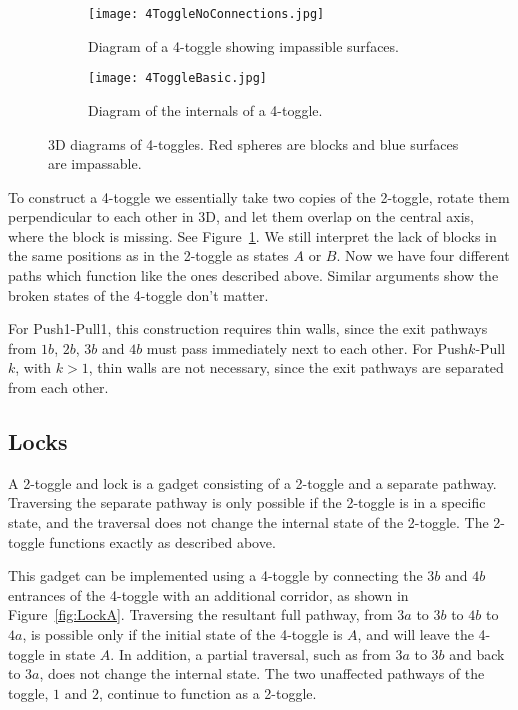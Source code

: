 \begin{figure}[!ht]
  \centering
  \begin{subfigure}[t]{.45\textwidth}
    \texttt{[image: 4ToggleNoConnections.jpg]}
    \caption{Diagram of a 4-toggle showing impassible surfaces.}
    \label{fig:4Toggle3D}
  \end{subfigure}
  \hfill
  \begin{subfigure}[t]{.45\textwidth}
    \texttt{[image: 4ToggleBasic.jpg]}
    \caption{Diagram of the internals of a 4-toggle.}
    \label{fig:4Toggle3DBasic}
  \end{subfigure}
  \caption{3D diagrams of 4-toggles. Red spheres are blocks and blue surfaces are impassable.}
\end{figure}

To construct a 4-toggle we essentially take two copies of the 2-toggle, rotate them perpendicular to each other in 3D, and let them overlap on the central axis, where the block is missing. See Figure~\ref{fig:4Toggle3D}. We still interpret the lack of blocks in the same positions as in the 2-toggle as states $A$ or $B$. Now we have four different paths which function like the ones described above. Similar arguments show the broken states of the 4-toggle don't matter.

For Push1-Pull1, this construction requires thin walls, since the exit pathways from $1b$, $2b$, $3b$ and $4b$ must pass immediately next to each other. For Push$k$-Pull$k$, with $k > 1$, thin walls are not necessary, since the exit pathways are separated from each other.
\subsection{Locks}

A 2-toggle and lock is a gadget consisting of a 2-toggle and a separate pathway. Traversing the separate pathway is only possible if the 2-toggle is in a specific state, and the traversal does not change the internal state of the 2-toggle. The 2-toggle functions exactly
as described above.


This gadget can be implemented using a 4-toggle by
connecting the $3b$ and $4b$ entrances of the 4-toggle with an additional corridor, as shown in Figure~\ref{fig:LockA}.
Traversing the resultant full pathway, from $3a$ to $3b$ to $4b$ to $4a$, is possible only if the initial
state of the 4-toggle is $A$, and will leave the 4-toggle in state $A$. In addition, a partial traversal,
such as from $3a$ to $3b$ and back to $3a$, does not change the internal state. The two unaffected
pathways of the toggle, $1$ and $2$, continue to function as a 2-toggle.

